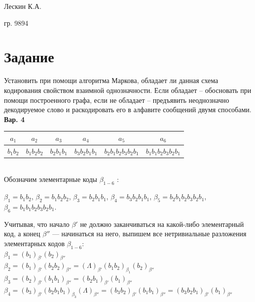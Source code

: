 Лескин К.А.

гр. 9894

\section*{Задание}

Установить при помощи алгоритма Маркова, обладает ли данная схема кодирования свойством взаимной однозначности. Если обладает – обосновать при помощи построенного графа, если не обладает – предъявить неоднозначно декодируемое слово и раскодировать его в алфавите сообщений двумя способами. 
\\

\textbf{Вар. 4}

\begin{tabular}{|c|c|c|c|c|c|}
    \hline
    $ a_1 $ & $ a_2 $ & $ a_3 $ & $ a_4 $ & $ a_5 $ & $ a_6 $\\
    \hline
    $ b_1b_2 $ & 
    $ b_1b_2b_2 $ & 
    $ b_2b_1b_1 $ & 
    $ b_3b_2b_1b_1 $ & 
    $ b_2b_1b_2b_3b_2b_1 $ & 
    $ b_1b_1b_2b_3b_2b_1 $\\
    \hline
\end{tabular}

\ 
\\

Обозначим элементарные коды $ \beta_{1-6} $ :

$ \beta_1 = b_1b_2 $,
$ \beta_2 = b_1b_2b_2 $,
$ \beta_3 = b_2b_1b_1 $,
$ \beta_4 = b_3b_2b_1b_1 $,
$ \beta_5 = b_2b_1b_2b_3b_2b_1 $,
$ \beta_6 = b_1b_1b_2b_3b_2b_1 $.

Учитывая, что начало $ \beta' $ не должно заканчиваться на какой-либо элементарный код, а конец $ \beta'' $ --- начинаться на него,
выпишем все нетривиальные разложения элементарных кодов $ \beta_{1-6} $:\\

$ 
\beta_1 = 
(b_1)_{\beta'}(b_2)_{\beta''} 
$
\\

$ 
\beta_2 = 
(b_1)_{\beta'}(b_2b_2)_{\beta''} = (\Lambda)_{\beta'}(b_1b_2)_{\beta_1}(b_2)_{\beta''}
$
\\

$ 
\beta_3 = 
(b_2)_{\beta'}(b_1b_1)_{\beta''} = 
(b_2b_1)_{\beta'}(b_1)_{\beta''} 
$
\\
 
$ 
\beta_4 = 
(b_3)_{\beta'}(b_2b_1b_1)_{\beta_3}(\Lambda)_{\beta''} = 
(b_3b_2)_{\beta'}(b_1b_1)_{\beta''} = 
(b_3b_2b_1)_{\beta'}(b_1)_{\beta''}
$
\\


